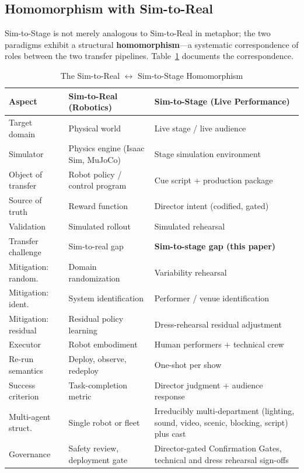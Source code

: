 \documentclass[11pt]{article}
\begin{document}
\subsection{Homomorphism with Sim-to-Real}
\label{sec:homomorphism}

Sim-to-Stage is not merely analogous to Sim-to-Real in metaphor; the two
paradigms exhibit a structural \textbf{homomorphism}---a systematic
correspondence of roles between the two transfer pipelines.
Table~\ref{tab:homomorphism} documents the correspondence.

\begin{table}[htbp]
\centering
\caption{The Sim-to-Real $\leftrightarrow$ Sim-to-Stage Homomorphism}
\label{tab:homomorphism}
\small
\renewcommand{\arraystretch}{1.3}
\begin{tabular}{p{2.9cm} p{3.6cm} p{6.2cm}}
\toprule
\textbf{Aspect} &
\textbf{Sim-to-Real (Robotics)} &
\textbf{Sim-to-Stage (Live Performance)} \\
\midrule
Target domain        & Physical world                   & Live stage / live audience \\
Simulator            & Physics engine (Isaac Sim, MuJoCo) & Stage simulation environment \\
Object of transfer   & Robot policy / control program   & Cue script + production package \\
Source of truth      & Reward function                  & Director intent (codified, gated) \\
Validation           & Simulated rollout                & Simulated rehearsal \\
\rowcolor{highlight}
Transfer challenge   & Sim-to-real gap                  & \textbf{Sim-to-stage gap (this paper)} \\
Mitigation: random.  & Domain randomization             & Variability rehearsal \\
Mitigation: ident.   & System identification            & Performer / venue identification \\
Mitigation: residual & Residual policy learning         & Dress-rehearsal residual adjustment \\
Executor             & Robot embodiment                 & Human performers + technical crew \\
Re-run semantics     & Deploy, observe, redeploy        & One-shot per show \\
Success criterion    & Task-completion metric           & Director judgment + audience response \\
Multi-agent struct.  & Single robot or fleet            & Irreducibly multi-department (lighting,
                                                         sound, video, scenic, blocking, script)
                                                         plus cast \\
Governance           & Safety review, deployment gate   & Director-gated Confirmation Gates,
                                                         technical and dress rehearsal sign-offs \\
\bottomrule
\end{tabular}
\end{table}
\end{document}
